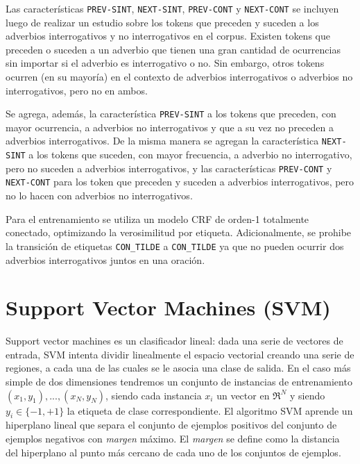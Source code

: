 \documentclass[runningheads,a4paper]{llncs}
\begin{document}
Las características \texttt{\small PREV-SINT}, \texttt{\small NEXT-SINT}, \texttt{\small PREV-CONT} y \texttt{\small NEXT-CONT} se incluyen luego de realizar un estudio sobre los tokens que preceden y  suceden a los adverbios interrogativos y no interrogativos en el corpus. Existen tokens que preceden o suceden a un adverbio que tienen una gran cantidad de ocurrencias sin importar si el adverbio es interrogativo o no. Sin embargo, otros tokens ocurren (en su mayoría) en el contexto de adverbios interrogativos o adverbios no interrogativos, pero no en ambos.

Se agrega, además, la característica \texttt{\small PREV-SINT} a los tokens que preceden, con mayor ocurrencia, a adverbios no interrogativos y que a su vez no preceden a adverbios interrogativos. De la misma manera se agregan la característica \texttt{\small NEXT-SINT} a los tokens que suceden, con mayor frecuencia, a adverbio no interrogativo, pero no suceden a adverbios interrogativos, y  las características \texttt{\small PREV-CONT} y \texttt{\small NEXT-CONT} para los token que preceden y suceden a adverbios interrogativos, pero no lo hacen con adverbios no interrogativos.

Para el entrenamiento se utiliza un modelo CRF de orden-1 totalmente conectado, optimizando la verosimilitud por etiqueta. Adicionalmente, se prohibe la transición de etiquetas \texttt{\small CON\_TILDE} a \texttt{\small CON\_TILDE} ya que no pueden ocurrir dos adverbios interrogativos juntos en una oración. 


\section{Support Vector Machines (SVM)}
\label{sec:SVM}

Support vector machines\cite{JOACHIMS99} es un clasificador lineal: dada una serie de vectores de entrada, SVM intenta dividir linealmente el espacio vectorial creando una serie de regiones, a cada una de las cuales se le asocia una clase de salida. En el caso más simple de dos dimensiones tendremos un conjunto de instancias de entrenamiento ${(x_1, y_1),...,(x_N,y_N)}$, siendo cada instancia $x_i$ un vector en $\Re^N$ y siendo $y_i \in \lbrace-1,+1\rbrace$ la etiqueta de clase correspondiente. El algoritmo SVM aprende un hiperplano lineal que separa el conjunto de ejemplos positivos del conjunto de ejemplos negativos con \emph{margen} máximo. El \emph{margen} se define como la distancia del hiperplano al punto más cercano de cada uno de los conjuntos de ejemplos.
\end{document}

